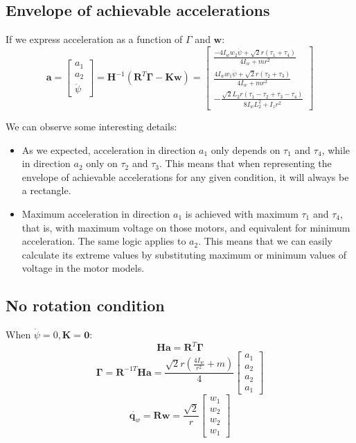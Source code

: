 \documentclass[12pt]{article}
\renewcommand{\vec}[1]{\bm{#1}}
\newcommand{\R}{\mathbb R}
\newcommand{\w}{\dot\varphi}
\def\R{\vec R}
\def\q{\vec q}
\begin{document}
\subsection{Envelope of achievable accelerations}
If we express acceleration as a function of $\Gamma$ and $\vec w$:
$$ \vec a = \left[\begin{matrix}a_{1}\\a_{2}\\\ddot{\psi}\end{matrix}\right] = \vec H^{-1}(\R^T \vec \Gamma - \vec K \vec w) =  \left[\begin{matrix}\frac{- 4 I_{w} w_{2} \dot{\psi} + \sqrt{2} r \left(\tau_{1} + \tau_{4}\right)}{4 I_{w} + m r^{2}}\\\frac{4 I_{w} w_{1} \dot{\psi} + \sqrt{2} r \left(\tau_{2} + \tau_{3}\right)}{4 I_{w} + m r^{2}}\\- \frac{\sqrt{2} L_{2} r \left(\tau_{1} - \tau_{2} + \tau_{3} - \tau_{4}\right)}{8 I_{w} L_{2}^{2} + I_{z} r^{2}}\end{matrix}\right]$$

We can observe some interesting details:
\begin{itemize}
	\item As we expected, acceleration in direction $a_1$ only depends on $\tau_1$ and $\tau_4$, while in direction $a_2$ only on $\tau_2$ and $\tau_3$. This means that when representing the envelope of achievable accelerations for any given condition, it will always be a rectangle.
	\item Maximum acceleration in direction $a_1$ is achieved with maximum $\tau_1$ and $\tau_4$, that is, with maximum voltage on those motors, and equivalent for minimum acceleration. The same logic applies to $a_2$. This means that we can easily calculate its extreme values by substituting maximum or minimum values of voltage in the motor models.
\end{itemize}
\subsection{No rotation condition}
When $\dot\psi = 0, \vec K =\vec 0$:
$$ \vec H\vec a = \R^T\vec \Gamma$$
$$\vec \Gamma = \R^{-1T}\vec H\vec a = \frac{\sqrt{2} r \left(\frac{4 I_{w}}{r^{2}} + m\right)}{4}\left[\begin{matrix}a_{1} \\a_{2} \\a_{2} \\a_{1} \end{matrix}\right]$$
$$\dot{\q_w} = \R \vec{w} = \frac{\sqrt{2}}{r} \left[\begin{matrix}w_1\\w_2\\w_2\\w_1\end{matrix}\right]$$
\end{document}
